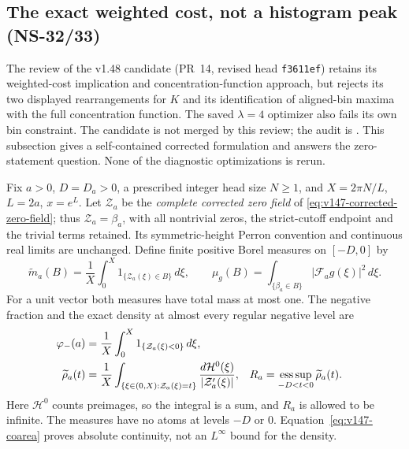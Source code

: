 \subsection*{The exact weighted cost, not a histogram peak (NS-32/33)}

The review of the v1.48 candidate (PR~14, revised head \texttt{f3611ef})
retains its weighted-cost implication and concentration-function approach,
but rejects its two displayed rearrangements for $K$ and its identification
of aligned-bin maxima with the full concentration function. The saved
$\lambda=4$ optimizer also fails its own bin constraint. The candidate
is not merged by this review; the audit is
.
This subsection gives a self-contained corrected formulation and answers
the zero-statement question. None of the diagnostic optimizations is rerun.

Fix $a>0$, $D=D_a>0$, a prescribed integer head size $N\ge1$, and $X=2\pi N/L$,
$L=2a$, $x=e^L$. Let $\mathcal Z_a$ be the \emph{complete corrected zero field}
of \eqref{eq:v147-corrected-zero-field}; thus $\mathcal Z_a=\beta_a$,
with all nontrivial zeros, the strict-cutoff endpoint and the trivial
terms retained. Its symmetric-height Perron convention and continuous
real limits are unchanged. Define finite positive Borel measures on
$[-D,0]$ by
\begin{equation}\label{eq:v149-measures}
 \widetilde m_a(B)=\frac1X\int_0^X
               1_{\{\mathcal Z_a(\xi)\in B\}}\,d\xi,
 \qquad
 \mu_g(B)=\int_{\{\beta_a\in B\}}|\mathcal F_ag(\xi)|^2\,d\xi.
\end{equation}
For a unit vector both measures have total mass at most one. The negative
fraction and the exact density at almost every regular negative level are
\begin{align}
 \varphi_-(a)&=\frac1X\int_0^X1_{\{\mathcal Z_a(\xi)<0\}}\,d\xi,
 \notag\\
 \widetilde\rho_a(t)&=\frac1X
  \int_{\{\xi\in(0,X):\mathcal Z_a(\xi)=t\}}
       \frac{d\mathcal H^0(\xi)}{|\mathcal Z_a'(\xi)|},
 &R_a&=\mathop{\rm ess\,sup}_{-D<t<0}\widetilde\rho_a(t).
 \label{eq:v149-zero-density}
\end{align}
Here $\mathcal H^0$ counts preimages, so the integral is a sum, and
$R_a$ is allowed to be infinite. The measures have no atoms at levels
$-D$ or $0$. Equation~\eqref{eq:v147-coarea} proves absolute continuity,
not an $L^\infty$ bound for the density.

